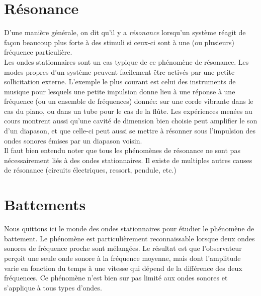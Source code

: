 \section{Résonance}

D'une manière générale, on dit qu'il y a {\it résonance} lorsqu'un système réagit de façon beaucoup plus forte à des stimuli si ceux-ci sont à une (ou plusieurs) fréquence particulière. \\

\noindent Les ondes stationnaires sont un cas typique de ce phénomène de résonance. Les modes propres d'un système peuvent facilement être activés par une petite sollicitation externe. L'exemple le plus courant est celui des instruments de musique pour lesquels une petite impulsion donne lieu à une réponse à une fréquence (ou un ensemble de fréquences) donnée: sur une corde vibrante dans le cas du piano, ou dans un tube pour le cas de la flûte. Les expériences menées au cours montrent aussi qu'une cavité de dimension bien choisie peut amplifier le son d'un diapason, et que celle-ci peut aussi se mettre à résonner sous l'impulsion des ondes sonores émises par un diapason voisin.\\


\noindent Il faut bien entendu noter que tous les phénomènes de résonance ne sont pas nécessairement liés à des ondes stationnaires. Il existe de multiples autres causes de résonance (circuits électriques, ressort, pendule, etc.)



\section{Battements}
Nous quittons ici le monde des ondes stationnaires pour étudier le phénomène de battement.
Le phénomène est particulièrement reconnaissable lorsque deux ondes sonores de fréquence proche sont mélangées. Le résultat est que l'observateur perçoit une seule onde sonore à la fréquence moyenne, mais dont l'amplitude varie en fonction du temps à une vitesse qui dépend de la différence des deux fréquences. Ce phénomène n'est bien sur pas limité aux ondes sonores et s'applique à tous types d'ondes.

